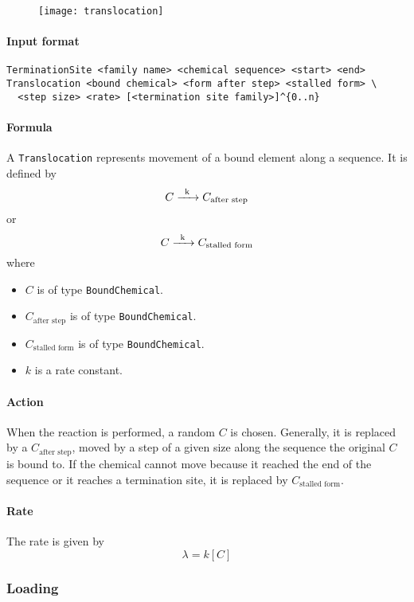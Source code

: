 \begin{figure}[!ht]
	\centering
	\texttt{[image: translocation]}
\end{figure}

\paragraph{Input format}
\begin{verbatim}
TerminationSite <family name> <chemical sequence> <start> <end>
Translocation <bound chemical> <form after step> <stalled form> \
  <step size> <rate> [<termination site family>]^{0..n}
\end{verbatim}

\paragraph{Formula} A \texttt{Translocation} represents movement of a bound element along a sequence. It is defined by
$$
	\reactionIrr{C}{C_\text{after step}}{k}{}
$$
or
$$
	\reactionIrr{C}{C_\text{stalled form}}{k}{}
$$
where
\begin{itemize}
	\item $C$ is of type \texttt{BoundChemical}.
	\item $C_\text{after step}$ is of type \texttt{BoundChemical}.
	\item $C_\text{stalled form}$ is of type \texttt{BoundChemical}.
	\item $k$ is a rate constant.
\end{itemize}

\paragraph{Action} When the reaction is performed, a random $C$ is chosen. Generally, it is replaced by a $C_\text{after step}$, moved by a step of a given size along the sequence the original $C$ is bound to. If the chemical cannot move because it reached the end of the sequence or it reaches a termination site, it is replaced by $C_\text{stalled form}$.

\paragraph{Rate} The rate is given by
$$
	\lambda = k [C]
$$

\subsubsection{Loading}


